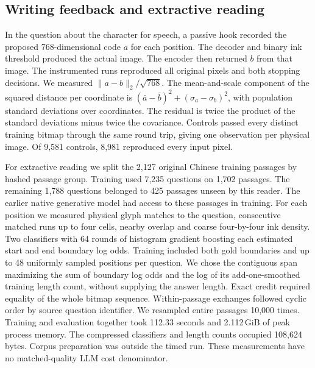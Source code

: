 \documentclass[12pt,a4paper]{article}
\providecommand{\DIFadd}[1]{{\protect\color{blue} \sf #1}} %
\begin{document}
\subsection*{\DIFadd{Writing feedback and extractive reading}}
\DIFadd{In the question about the character for speech, a passive hook recorded
the proposed 768-dimensional code $a$ for each position. The decoder and
binary ink threshold produced the actual image. The encoder then returned
$b$ from that image. The instrumented runs reproduced all original pixels
and both stopping decisions. We measured $\|a-b\|_2/\sqrt{768}$. The
mean-and-scale component of the squared distance per coordinate is
$(\bar a-\bar b)^2+(\sigma_a-\sigma_b)^2$, with population standard deviations
over coordinates. The residual is twice the product of the standard
deviations minus twice the covariance. Controls passed every distinct
training bitmap through the same round trip, giving one observation per
physical image. Of 9,581 controls, 8,981 reproduced every input pixel.
}

\DIFadd{For extractive reading we split the 2,127 original Chinese training passages
by hashed passage group. Training used 7,235 questions on 1,702 passages.
The remaining 1,788 questions belonged to 425 passages unseen by this reader.
The earlier native generative model had access to these passages in training.
For each position we measured physical glyph matches to the question,
consecutive matched runs up to four cells, nearby overlap and coarse
four-by-four ink density. Two classifiers with 64 rounds of histogram gradient
boosting each estimated start and end boundary log odds. Training included
both gold boundaries and up to 48 uniformly sampled positions per question.
We chose the contiguous span maximizing the sum of boundary log odds and
the log of its add-one-smoothed training length count, without supplying the
answer length. Exact credit required equality of the whole bitmap sequence.
Within-passage exchanges followed cyclic order by source question identifier.
We resampled entire passages 10,000 times. Training and evaluation together
took 112.33 seconds and 2.112\,GiB of peak process memory. The compressed
classifiers and length counts occupied 108,624 bytes. Corpus preparation was
outside the timed run. These measurements have no matched-quality LLM cost
denominator.
}
\end{document}
